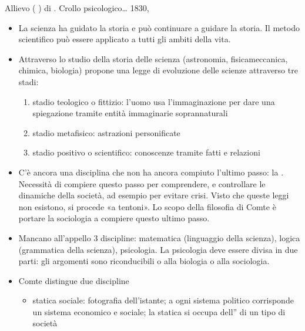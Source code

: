 \documentclass[letterpaper,10pt,italian]{jupyterBook}
\begin{document}
\sphinxAtStartPar
{} Allievo ( ) di {\hyperref[\detokenize{ch/history:pc-saint-simon}]{}}. Crollo psicologico…
 1830, 
\begin{itemize}
\item {} 
\sphinxAtStartPar
La scienza ha guidato la storia e può continuare a guidare la storia. Il metodo scientifico può essere applicato a tutti gli ambiti della vita.

\item {} 
\sphinxAtStartPar
{} Attraverso lo studio della storia delle scienza (astronomia, fisica\sphinxhyphen{}meccanica, chimica, biologia) propone una legge di evoluzione delle scienze attraverso tre stadi:
\begin{enumerate}
%
\item {} 
\sphinxAtStartPar
stadio teologico o fittizio: l’uomo usa l’immaginazione per dare una spiegazione tramite entità immaginarie soprannaturali

\item {} 
\sphinxAtStartPar
stadio metafisico: astrazioni personificate

\item {} 
\sphinxAtStartPar
stadio positivo o scientifico: conoscenze tramite fatti e relazioni

\end{enumerate}

\item {} 
\sphinxAtStartPar
C’è ancora una disciplina che non ha ancora compiuto l’ultimo passo: la . Necessità di compiere questo passo per comprendere,  e controllare le dinamiche della società, ad esempio per evitare crisi. Visto che queste leggi non esistono, si procede «a tentoni». Lo scopo della filosofia di Comte è portare la sociologia a compiere questo ultimo passo.

\item {} 
\sphinxAtStartPar
Mancano all’appello 3 discipline: matematica (linguaggio della scienza), logica (grammatica della scienza), psicologia. La psicologia deve essere divisa in due parti: gli argomenti sono riconducibili o alla biologia o alla sociologia.

\item {} 
\sphinxAtStartPar
{} Comte distingue due discipline
\begin{itemize}
\item {} 
\sphinxAtStartPar
statica sociale: fotografia dell’istante; a ogni sistema politico corrisponde un sistema economico e sociale; la statica si occupa dell” di un tipo di società


\end{itemize}
\end{itemize}
\end{document}
